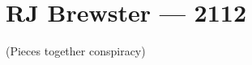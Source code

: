 \hypertarget{rj-brewster-2112}{%
\chapter*{RJ Brewster — 2112}\label{rj-brewster-2112}}

(Pieces together conspiracy)
